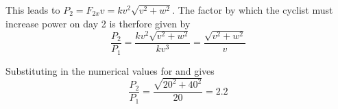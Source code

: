\begin{problem}
{\begin{enumerate}
This leads to $P_2 = F_{2x} v = kv^2 \sqrt{v^2 + w^2}$. The factor by which the cyclist must increase power on day 2 is therfore given by
\begin{equation} \frac{P_2}{P_1} = \frac{ kv^2 \sqrt{v^2 + w^2}}{k v^3} = \frac{ \sqrt{v^2 + w^2}}{ v}\end{equation}

Substituting in the numerical values for  and  gives  
\begin{equation}\frac{P_2}{P_1}= \frac{ \sqrt{20^2 + 40^2}}{20} = 2.2\end{equation}

\end{enumerate}
}
\end{problem}
%


